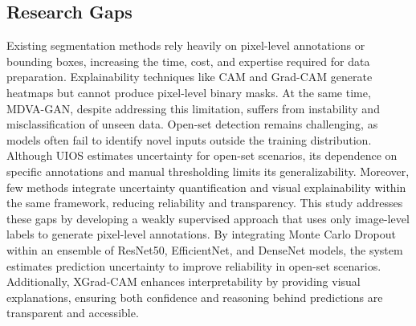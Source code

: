 \subsection{Research Gaps}

Existing segmentation methods rely heavily on pixel-level annotations or bounding boxes, increasing the time, cost, and expertise required for data preparation. Explainability techniques like CAM and Grad-CAM generate heatmaps but cannot produce pixel-level binary masks. At the same time, MDVA-GAN, despite addressing this limitation, suffers from instability and misclassification of unseen data. Open-set detection remains challenging, as models often fail to identify novel inputs outside the training distribution. Although UIOS estimates uncertainty for open-set scenarios, its dependence on specific annotations and manual thresholding limits its generalizability. Moreover, few methods integrate uncertainty quantification and visual explainability within the same framework, reducing reliability and transparency. This study addresses these gaps by developing a weakly supervised approach that uses only image-level labels to generate pixel-level annotations. By integrating Monte Carlo Dropout within an ensemble of ResNet50, EfficientNet, and DenseNet models, the system estimates prediction uncertainty to improve reliability in open-set scenarios. Additionally, XGrad-CAM enhances interpretability by providing visual explanations, ensuring both confidence and reasoning behind predictions are transparent and accessible.